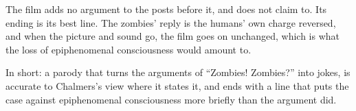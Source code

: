 \begin{afterword}
The film adds no argument to the posts before it, and does not claim to. Its ending is its best line. The zombies' reply is the humans' own charge reversed, and when the picture and sound go, the film goes on unchanged, which is what the loss of epiphenomenal consciousness would amount to.

In short: a parody that turns the arguments of ``Zombies! Zombies?'' into jokes, is accurate to Chalmers's view where it states it, and ends with a line that puts the case against epiphenomenal consciousness more briefly than the argument did.
\end{afterword}
